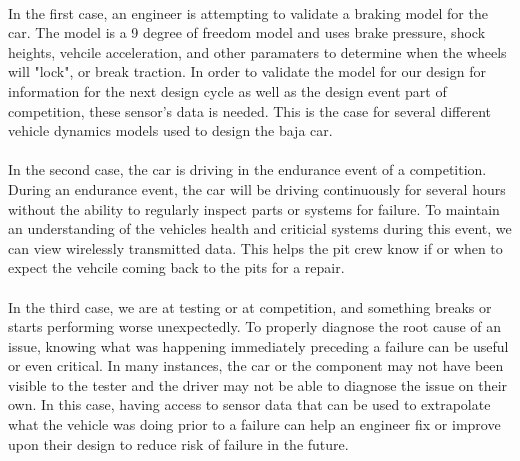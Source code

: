 \paragraph{}
In the first case, an engineer is attempting to validate a braking model for the car.
The model is a 9 degree of freedom model and uses brake pressure, shock heights, vehcile acceleration, and other paramaters to determine when the wheels will "lock", or break traction.
In order to validate the model for our design for information for the next design cycle as well as the design event part of competition, these sensor's data is needed.
This is the case for several different vehicle dynamics models used to design the baja car.

\paragraph{}
In the second case, the car is driving in the endurance event of a competition.
During an endurance event, the car will be driving continuously for several hours without the ability to regularly inspect parts or systems for failure.
To maintain an understanding of the vehicles health and criticial systems during this event, we can view wirelessly transmitted data.
This helps the pit crew know if or when to expect the vehcile coming back to the pits for a repair.

\paragraph{}
In the third case, we are at testing or at competition, and something breaks or starts performing worse unexpectedly.
To properly diagnose the root cause of an issue, knowing what was happening immediately preceding a failure can be useful or even critical.
In many instances, the car or the component may not have been visible to the tester and the driver may not be able to diagnose the issue on their own.
In this case, having access to sensor data that can be used to extrapolate what the vehicle was doing prior to a failure can help an engineer fix or improve upon their design to reduce risk of failure in the future.